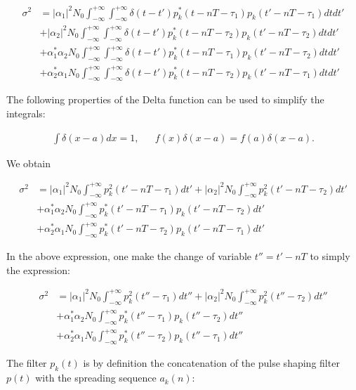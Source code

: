 \documentclass [a4paper, 11pt] {article}
\begin{document}
\begin{solution}
\begin{enumerate}
\begin{align}
\sigma^2 &= |\alpha_1|^2N_0 \int_{-\infty}^{+\infty}\int_{-\infty}^{+\infty}\delta(t-t')p_k^*(t-nT-\tau_{1})p_k(t'-nT-\tau_{1})dtdt' \\
&+ |\alpha_2|^2N_0 \int_{-\infty}^{+\infty}\int_{-\infty}^{+\infty}\delta(t-t')p_k^*(t-nT-\tau_{2})p_k(t'-nT-\tau_{2})dtdt' \nonumber\\
&+ \alpha_1^*\alpha_2N_0 \int_{-\infty}^{+\infty}\int_{-\infty}^{+\infty}\delta(t-t')p_k^*(t-nT-\tau_{1})p_k(t'-nT-\tau_{2})dtdt' \nonumber\\
&+ \alpha_2^*\alpha_1N_0 \int_{-\infty}^{+\infty}\int_{-\infty}^{+\infty}\delta(t-t')p_k^*(t-nT-\tau_{2})p_k(t'-nT-\tau_{1})dtdt'\nonumber
\end{align}


The following properties of the Delta function can be used to simplify the integrals: 

\begin{align}
    \int \delta(x-a) dx = 1, &&  f(x)\delta(x-a) = f(a)\delta(x-a).
\end{align}

We obtain 

\begin{align}
\sigma^2 &= |\alpha_1|^2N_0 \int_{-\infty}^{+\infty}p_k^2(t'-nT-\tau_{1})dt' + |\alpha_2|^2N_0 \int_{-\infty}^{+\infty}p_k^2(t'-nT-\tau_{2})dt' \\
&+ \alpha_1^*\alpha_2N_0 \int_{-\infty}^{+\infty}p_k^*(t'-nT-\tau_{1})p_k(t'-nT-\tau_{2})dt'\nonumber\\ 
&+ \alpha_2^*\alpha_1N_0 \int_{-\infty}^{+\infty}p_k^*(t'-nT-\tau_{2})p_k(t'-nT-\tau_{1})dt'\nonumber
\end{align}

In the above expression, one make the change of variable $t''=t'-nT$ to simply the expression: 

\begin{align}
\sigma^2 &= |\alpha_1|^2N_0 \int_{-\infty}^{+\infty}p_k^2(t''-\tau_{1})dt'' + |\alpha_2|^2N_0 \int_{-\infty}^{+\infty}p_k^2(t''-\tau_{2})dt'' \\
&+ \alpha_1^*\alpha_2N_0 \int_{-\infty}^{+\infty}p_k^*(t''-\tau_{1})p_k(t''-\tau_{2})dt''\nonumber\\ 
&+ \alpha_2^*\alpha_1N_0 \int_{-\infty}^{+\infty}p_k^*(t''-\tau_{2})p_k(t''-\tau_{1})dt'' \nonumber
\end{align}

The filter $p_k(t)$ is by definition the concatenation of the pulse shaping filter $p(t)$ with the spreading sequence $a_k(n)$: 


\end{enumerate}
\end{solution}
\end{document}
